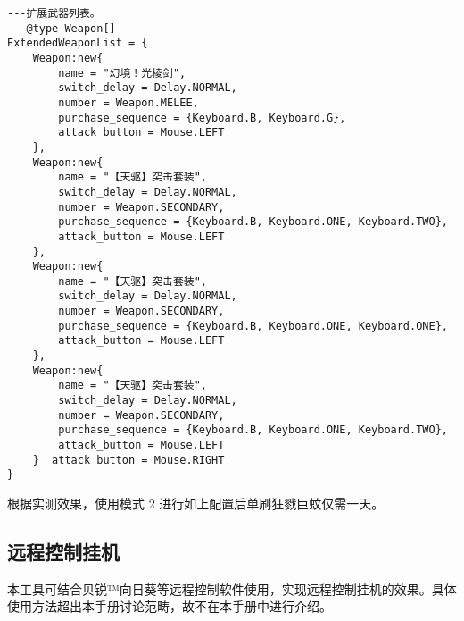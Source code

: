 \begin{verbatim}
---扩展武器列表。
---@type Weapon[]
ExtendedWeaponList = {
    Weapon:new{
        name = "幻境！光棱剑",
        switch_delay = Delay.NORMAL,
        number = Weapon.MELEE,
        purchase_sequence = {Keyboard.B, Keyboard.G},
        attack_button = Mouse.LEFT
    },
    Weapon:new{
        name = "【天驱】突击套装",
        switch_delay = Delay.NORMAL,
        number = Weapon.SECONDARY,
        purchase_sequence = {Keyboard.B, Keyboard.ONE, Keyboard.TWO},
        attack_button = Mouse.LEFT
    },
    Weapon:new{
        name = "【天驱】突击套装",
        switch_delay = Delay.NORMAL,
        number = Weapon.SECONDARY,
        purchase_sequence = {Keyboard.B, Keyboard.ONE, Keyboard.ONE},
        attack_button = Mouse.LEFT
    },
    Weapon:new{
        name = "【天驱】突击套装",
        switch_delay = Delay.NORMAL,
        number = Weapon.SECONDARY,
        purchase_sequence = {Keyboard.B, Keyboard.ONE, Keyboard.TWO},
        attack_button = Mouse.LEFT
    }  attack_button = Mouse.RIGHT
}
\end{verbatim}

根据实测效果，使用模式 2 进行如上配置后单刷狂戮巨蚊仅需一天。

\subsection{远程控制挂机}

本工具可结合贝锐™向日葵等远程控制软件使用，实现远程控制挂机的效果。具体使用方法超出本手册讨论范畴，故不在本手册中进行介绍。